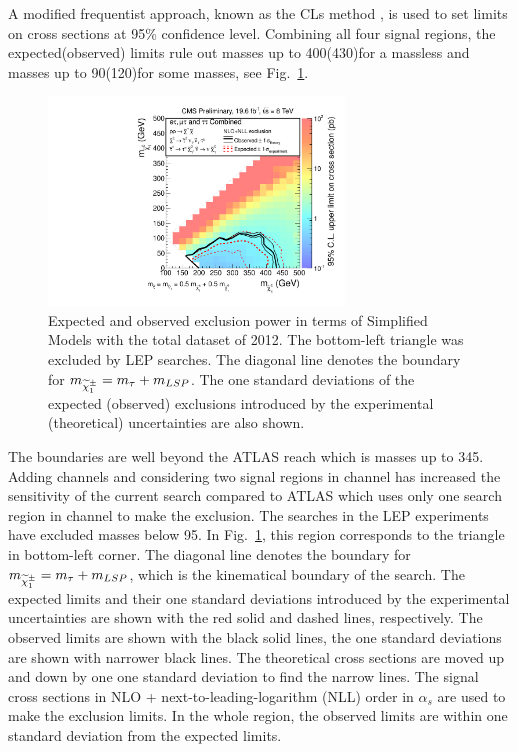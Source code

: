 A modified frequentist approach, known as the CLs method \cite{read:CLs}, is used to 
set limits on cross sections at 95\% confidence level.
Combining all four signal regions,
the expected(observed) limits rule out \chione  masses up to 400(430)\GeV  for a massless \PSGczDo and  
\PSGczDo masses up to 90(120)\GeV for some  \chione masses,
see Fig.~\ref{fig:limit_final}. 
\begin{linenomath}
\begin{figure}[!htb]
\centering
\includegraphics[width=0.7\textwidth,keepaspectratio=true]{StatisticsFig/Exclusion4Bins.pdf}
\caption{Expected and observed exclusion power in terms of Simplified Models
with the total dataset of 2012. The bottom-left triangle was excluded by LEP \sTau searches. 
The diagonal line denotes the boundary for $m_{\widetilde{\chi}^{\pm}_1} = m_{\tau} + m_{LSP}$.
The one standard deviations of the expected (observed) exclusions introduced by the experimental 
(theoretical) uncertainties are also shown.}
\label{fig:limit_final}
\end{figure}
\end{linenomath}
The boundaries are well beyond the ATLAS reach which is \chione  masses up to 345\GeV \cite{Aad:2014yka}. Adding \leptonTau channels
and considering two signal regions in \tauTau channel has increased the sensitivity of the current search compared to ATLAS which uses only 
one search region in \tauTau channel to make the exclusion.
The \sTau searches in the LEP experiments \cite{lepsusy} have excluded masses below 95\GeV. In Fig.~\ref{fig:limit_final}, 
this region corresponds to the triangle in bottom-left corner. %
The diagonal line denotes the boundary for $m_{\widetilde{\chi}^{\pm}_1} = m_{\tau} + m_{LSP}$, which is the kinematical boundary of the search.
The expected limits and their one standard deviations introduced by the experimental 
uncertainties are shown with the red solid and dashed lines, respectively. The observed limits are shown with the black solid lines, the one 
standard deviations are shown with narrower black lines. The theoretical cross sections are moved up and down by one one standard deviation to 
find the narrow lines.
The signal cross sections in NLO + next-to-leading-logarithm (NLL) order in $\alpha_s$ are used to make the exclusion limits.
In the whole region, the observed limits are within one standard deviation from the expected limits.  

